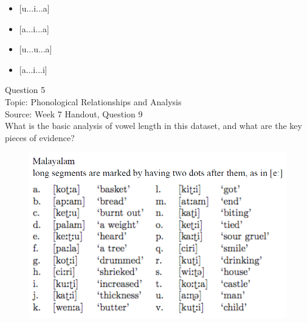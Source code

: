 \documentclass[12pt]{article}
\begin{document}
\begin{itemize} \item {[u...i...a]} \item {[a...i...a]} \item {[u...u...a]} \item {[a...i...i]} \end{itemize}


\newpage

{\large Question 5}\\

Topic: Phonological Relationships and Analysis\\
Source: Week 7 Handout, Question 9\\

What is the basic analysis of vowel length in this dataset, and what are the key pieces of evidence?\\

\begin{figure}[H]
\includegraphics{../images/malayalam.png}
\end{figure}

\newpage

\begin{center}
\textbf{{\color{red}{\HUGE END OF EXAM}}}\\

\end{center}
\newpage

\begin{center}
\textbf{{\color{blue}{\HUGE START OF EXAM\\}}}

\textbf{{\color{blue}{\HUGE Student ID: 83841\\}}}

\textbf{{\color{blue}{\HUGE \\}}}

\end{center}
\newpage
\end{document}
